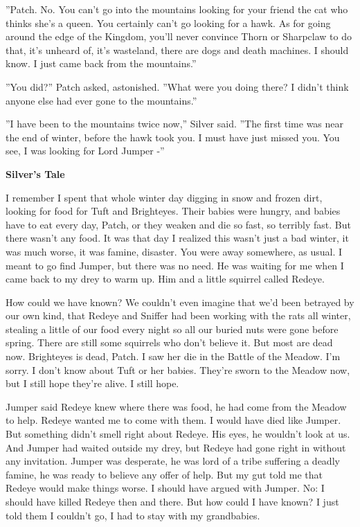 \documentclass[11pt]{article}
\begin{document}
 ''Patch. No. You can't go into the mountains looking for your friend the cat who thinks she's a queen. You certainly can't go looking for a hawk. As for going around the edge of the Kingdom, you'll never convince Thorn or Sharpclaw to do that, it's unheard of, it's wasteland, there are dogs and death machines. I should know. I just came back from the mountains.''\par
 ''You did?'' Patch asked, astonished. ''What were you doing there? I didn't think anyone else had ever gone to the mountains.''\par
 ''I have been to the mountains twice now,'' Silver said. ''The first time was near the end of winter, before the hawk took you. I must have just missed you. You see, I was looking for Lord Jumper -''\par
\par
{\bf Silver's Tale\par
}\par
 I remember I spent that whole winter day digging in snow and frozen dirt, looking for food for Tuft and Brighteyes. Their babies were hungry, and babies have to eat every day, Patch, or they weaken and die so fast, so terribly fast. But there wasn't any food. It was that day I realized this wasn't just a bad winter, it was much worse, it was famine, disaster. You were away somewhere, as usual. I meant to go find Jumper, but there was no need. He was waiting for me when I came back to my drey to warm up. Him and a little squirrel called Redeye.\par
 How could we have known? We couldn't even imagine that we'd been betrayed by our own kind, that Redeye and Sniffer had been working with the rats all winter, stealing a little of our food every night so all our buried nuts were gone before spring. There are still some squirrels who don't believe it. But most are dead now. Brighteyes is dead, Patch. I saw her die in the Battle of the Meadow. I'm sorry. I don't know about Tuft or her babies. They're sworn to the Meadow now, but I still hope they're alive. I still hope.\par
 Jumper said Redeye knew where there was food, he had come from the Meadow to help. Redeye wanted me to come with them. I would have died like Jumper. But something didn't smell right about Redeye. His eyes, he wouldn't look at us. And Jumper had waited outside my drey, but Redeye had gone right in without any invitation. Jumper was desperate, he was lord of a tribe suffering a deadly famine, he was ready to believe any offer of help. But my gut told me that Redeye would make things worse. I should have argued with Jumper. No: I should have killed Redeye then and there. But how could I have known? I just told them I couldn't go, I had to stay with my grandbabies.\par
\end{document}
